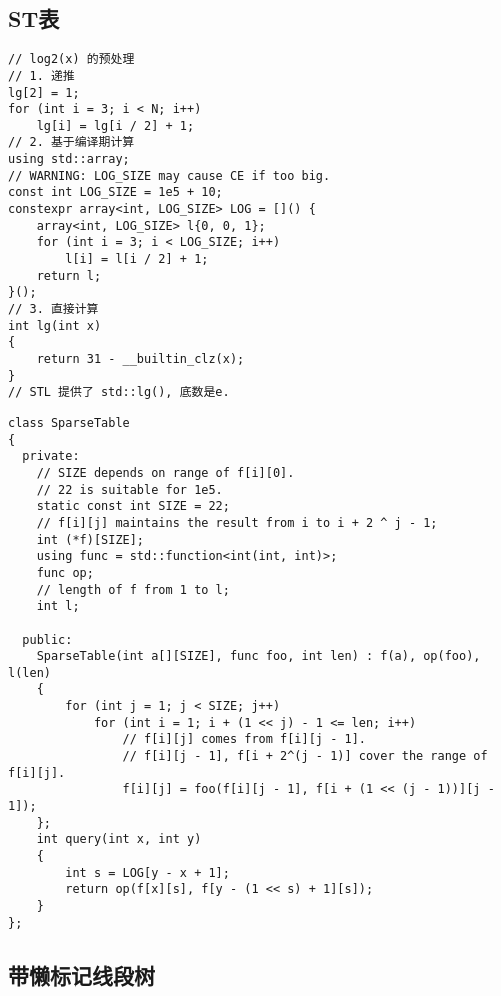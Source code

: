 \documentclass[]{article}
\begin{document}
\hypertarget{stux8868}{%
\subsection{ST表}\label{stux8868}}

\begin{verbatim}
// log2(x) 的预处理
// 1. 递推
lg[2] = 1;
for (int i = 3; i < N; i++)
    lg[i] = lg[i / 2] + 1;
// 2. 基于编译期计算
using std::array;
// WARNING: LOG_SIZE may cause CE if too big.
const int LOG_SIZE = 1e5 + 10;
constexpr array<int, LOG_SIZE> LOG = []() {
    array<int, LOG_SIZE> l{0, 0, 1};
    for (int i = 3; i < LOG_SIZE; i++)
        l[i] = l[i / 2] + 1;
    return l;
}();
// 3. 直接计算
int lg(int x)
{
    return 31 - __builtin_clz(x);
}
// STL 提供了 std::lg(), 底数是e.
\end{verbatim}

\begin{verbatim}
class SparseTable
{
  private:
    // SIZE depends on range of f[i][0].
    // 22 is suitable for 1e5.
    static const int SIZE = 22;
    // f[i][j] maintains the result from i to i + 2 ^ j - 1;
    int (*f)[SIZE];
    using func = std::function<int(int, int)>;
    func op;
    // length of f from 1 to l;
    int l;

  public:
    SparseTable(int a[][SIZE], func foo, int len) : f(a), op(foo), l(len)
    {
        for (int j = 1; j < SIZE; j++)
            for (int i = 1; i + (1 << j) - 1 <= len; i++)
                // f[i][j] comes from f[i][j - 1].
                // f[i][j - 1], f[i + 2^(j - 1)] cover the range of f[i][j].
                f[i][j] = foo(f[i][j - 1], f[i + (1 << (j - 1))][j - 1]);
    };
    int query(int x, int y)
    {
        int s = LOG[y - x + 1];
        return op(f[x][s], f[y - (1 << s) + 1][s]);
    }
};
\end{verbatim}

\hypertarget{ux5e26ux61d2ux6807ux8bb0ux7ebfux6bb5ux6811}{%
\subsection{带懒标记线段树}\label{ux5e26ux61d2ux6807ux8bb0ux7ebfux6bb5ux6811}}
\end{document}

